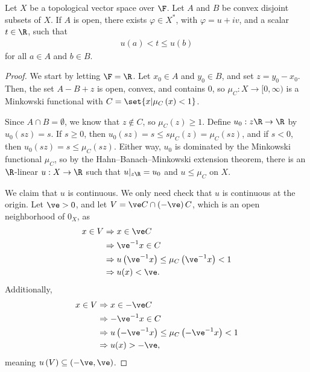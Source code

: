 \documentclass[10pt]{mypackage}
\begin{document}
\begin{theorem}
  Let $X$ be a topological vector space over $\F$. Let $A$ and $B$ be convex disjoint subsets of $X$. If $A$ is open, there exists $\varphi\in X^{\ast}$, with $\varphi = u + iv$, and a scalar $t\in \R$, such that
  \begin{align*}
    u(a) < t \leq u(b)
  \end{align*}
  for all $a\in A$ and $b\in B$.
\end{theorem}
\begin{proof}
  We start by letting $\F = \R$. Let $x_0\in A$ and $y_0\in B$, and set $z = y_0 - x_0$. Then, the set $A - B + z$ is open, convex, and contains $0$, so $\mu_{C}:X\rightarrow [0,\infty)$ is a Minkowski functional with $C = \set{x | \mu_{C}\left(x\right) < 1}$.\newline

  Since $A\cap B = \emptyset$, we know that $z\notin C$, so $\mu_{C}\left(z\right) \geq 1$. Define $u_0: z\R \rightarrow \R$ by $u_0\left(sz\right) = s$. If $s\geq 0$, then $u_{0}\left(sz\right) = s \leq s\mu_{C}\left(z\right) = \mu_{C}\left(sz\right)$, and if $s < 0$, then $u_0\left(sz\right) = s \leq \mu_{C}\left(sz\right)$. Either way, $u_0$ is dominated by the Minkowski functional $\mu_{C}$, so by the Hahn--Banach--Minkowski extension theorem, there is an $\R$-linear $u: X\rightarrow \R$ such that $u|_{z\R} = u_0$ and $u\leq \mu_{C}$ on $X$.\newline

  We claim that $u$ is continuous. We only need check that $u$ is continuous at the origin. Let $\ve > 0$, and let $V = \ve C \cap \left(-\ve\right)C$, which is an open neighborhood of $0_X$, as
  \begin{align*}
    x\in V &\Rightarrow x\in \ve C\\
           &\Rightarrow \ve^{-1}x\in C\\
           &\Rightarrow u\left(\ve^{-1} x\right)\leq \mu_{C}\left(\ve^{-1}x\right)< 1\\
           &\Rightarrow u(x) < \ve.
  \end{align*}
  Additionally,
  \begin{align*}
    x\in V &\Rightarrow x\in -\ve C\\
           &\Rightarrow -\ve^{-1}x \in C\\
           &\Rightarrow u\left(-\ve^{-1}x\right) \leq \mu_{C}\left(-\ve^{-1}x\right) < 1\\
           &\Rightarrow u(x) > -\ve,
  \end{align*}
  meaning $u\left(V\right) \subseteq \left(-\ve,\ve\right)$.\newline


\end{proof}
\end{document}
